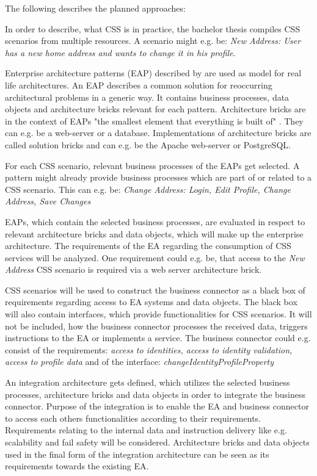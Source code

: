 \documentclass{article}
\begin{document}
The following describes the planned approaches:

In order to describe, what CSS is in practice, the bachelor thesis compiles CSS scenarios from multiple
resources. A scenario might e.g. be: \textit{New Address: User has a new home address and wants to change it in his profile}.

Enterprise architecture patterns (EAP) described by \cite{architecturePatterns} are used as model for
real life architectures. An EAP describes a common solution for reoccurring architectural problems in a 
generic way. It contains business processes, data objects and architecture bricks relevant for each pattern.
Architecture bricks are in the context of EAPs "the smallest element that everything is built of" 
\cite[Page 21]{architecturePatterns}. They can e.g. be a web-server or a database. Implementations of 
architecture bricks are called solution bricks and can e.g. be the Apache web-server or PostgreSQL.

For each CSS scenario, relevant business processes of the EAPs get selected. A pattern might already
provide business processes which are part of or related to a CSS scenario.
This can e.g. be: \textit{Change Address: Login, Edit Profile, Change Address, Save Changes}

EAPs, which contain the selected business processes, are evaluated in respect to relevant architecture 
bricks and data objects, which will make up the enterprise architecture. The requirements of the EA 
regarding the consumption of CSS services will be analyzed. One requirement could e.g. be, that access to 
the \textit{New Address} CSS scenario is required via a web server architecture brick.

CSS scenarios will be used to construct the business connector as a black box of requirements regarding 
access to EA systems and data objects. The black box will also contain interfaces, which provide functionalities for CSS 
scenarios. It will not be included, how the business 
connector processes the received data, triggers instructions to the EA or implements a service.
The business connector could e.g. consist of the requirements: \textit{access to identities, access to identity validation, 
access to profile data} and of the interface: \textit{changeIdentityProfileProperty}

An integration architecture gets defined, which utilizes the selected business processes, architecture 
bricks and data objects in order to integrate the business connector. Purpose of the integration is to enable 
the EA and business connector to access each others functionalities according to their requirements.
Requirements relating to the internal data and instruction delivery like e.g. scalability and fail safety will be considered.
Architecture bricks and data objects used in the final form of the 
integration architecture can be seen as its requirements towards the existing EA.
\end{document}
